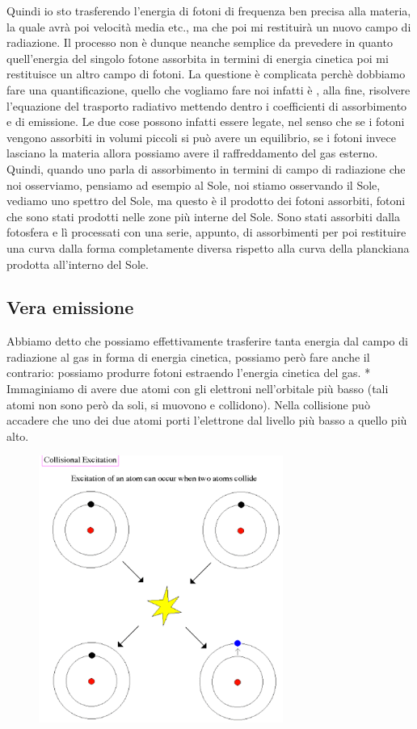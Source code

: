 \documentclass[a4paper,11pt]{article}
\begin{document}
Quindi io sto trasferendo l'energia di fotoni di frequenza ben precisa alla materia, la quale avrà poi velocità media etc., ma che poi mi restituirà un nuovo campo di radiazione. Il processo non è dunque neanche semplice da prevedere in quanto quell'energia del singolo fotone assorbita in termini di energia cinetica poi mi restituisce un altro campo di fotoni. La questione è complicata perchè dobbiamo fare una quantificazione, quello che vogliamo fare noi infatti è , alla fine, risolvere l'equazione del trasporto radiativo mettendo dentro i coefficienti di assorbimento e di emissione. Le due cose possono infatti essere legate, nel senso che se i fotoni vengono assorbiti in volumi piccoli si può avere un equilibrio, se i fotoni invece lasciano la materia allora possiamo avere il raffreddamento del gas esterno.
\newline
Quindi, quando uno parla di assorbimento in termini di campo di radiazione che noi osserviamo, pensiamo ad esempio al Sole, noi stiamo osservando il Sole, vediamo uno spettro del Sole, ma questo è il prodotto dei fotoni assorbiti, fotoni che sono stati prodotti nelle zone più interne del Sole. Sono stati assorbiti dalla fotosfera e lì processati con una serie, appunto, di assorbimenti per poi restituire una curva dalla forma completamente diversa rispetto alla curva della planckiana prodotta all'interno del Sole.
\subsection{Vera emissione}
Abbiamo detto che possiamo effettivamente trasferire tanta energia dal campo di radiazione al gas in forma di energia cinetica, possiamo però fare anche il contrario: possiamo produrre fotoni estraendo l'energia cinetica del gas.
\newline
*
\newline
Immaginiamo di avere due atomi con gli elettroni nell'orbitale più basso (tali atomi non sono però da soli, si muovono e collidono). Nella collisione può accadere che uno dei due atomi porti l'elettrone dal livello più basso a quello più alto.
\begin{figure}[h]
    \centering
    \includegraphics [width=8cm]{28-10.6(eccitazione_per_collisione).png}
    \label{fig:eccitazione_per_collisione}
\end{figure}
\end{document}
